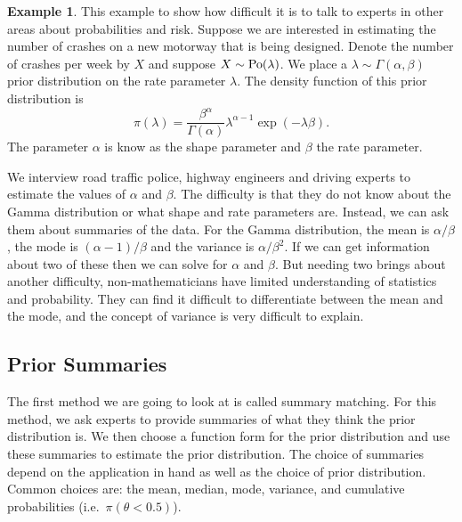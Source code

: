 \documentclass[
]{book}
\theoremstyle{definition}
\theoremstyle{definition}
\newtheorem{example}{Example}[chapter]
\theoremstyle{definition}
\theoremstyle{definition}
\theoremstyle{remark}
\begin{document}
\begin{example}
This example to show how difficult it is to talk to experts in other areas about probabilities and risk. Suppose we are interested in estimating the number of crashes on a new motorway that is being designed. Denote the number of crashes per week by \(X\) and suppose \(X \sim \hbox{Po}(\lambda)\). We place a \(\lambda \sim \Gamma(\alpha, \beta)\) prior distribution on the rate parameter \(\lambda\). The density function of this prior distribution is
\[
\pi(\lambda) = \frac{\beta^\alpha}{\Gamma(\alpha)}\lambda^{\alpha-1}\exp(-\lambda\beta). 
\]
The parameter \(\alpha\) is know as the shape parameter and \(\beta\) the rate parameter.

We interview road traffic police, highway engineers and driving experts to estimate the values of \(\alpha\) and \(\beta\). The difficulty is that they do not know about the Gamma distribution or what shape and rate parameters are. Instead, we can ask them about summaries of the data. For the Gamma distribution, the mean is \(\alpha/\beta\), the mode is \((\alpha - 1)/\beta\) and the variance is \(\alpha/\beta^2\). If we can get information about two of these then we can solve for \(\alpha\) and \(\beta\). But needing two brings about another difficulty, non-mathematicians have limited understanding of statistics and probability. They can find it difficult to differentiate between the mean and the mode, and the concept of variance is very difficult to explain.
\end{example}

\hypertarget{prior-summaries}{%
\subsection{Prior Summaries}\label{prior-summaries}}

The first method we are going to look at is called summary matching. For this method, we ask experts to provide summaries of what they think the prior distribution is. We then choose a function form for the prior distribution and use these summaries to estimate the prior distribution. The choice of summaries depend on the application in hand as well as the choice of prior distribution. Common choices are: the mean, median, mode, variance, and cumulative probabilities (i.e.~\(\pi(\theta < 0.5)\)).
\end{document}
